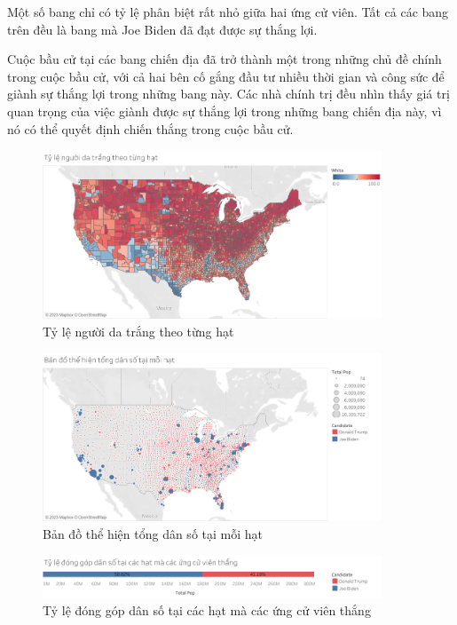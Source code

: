 \documentclass[14pt, a4paper]{article}
\numberwithin{equation}{section}
\numberwithin{figure}{section}
\numberwithin{dl}{section}
\numberwithin{md}{section}
\numberwithin{bd}{section}
\numberwithin{dn}{section}
\numberwithin{hq}{section}
\begin{document}
    Một số bang chỉ có tỷ lệ phân biệt rất nhỏ giữa hai ứng cử viên.
    Tất cả các bang trên đều là bang mà Joe Biden đã đạt được sự thắng lợi.

    Cuộc bầu cử tại các bang chiến địa đã trở thành một trong những chủ đề chính trong cuộc bầu cử, với cả hai bên cố gắng đầu tư nhiều thời gian và công sức để giành sự thắng lợi trong những bang này. 
    Các nhà chính trị đều nhìn thấy giá trị quan trọng của việc giành được sự thắng lợi trong những bang chiến địa này, vì nó có thể quyết định chiến thắng trong cuộc bầu cử.

    \begin{figure}[h!]
        \centering
        \includegraphics[width=0.9\textwidth]{figures/County_Percentage_White_People.png}
        \caption{Tỷ lệ người da trắng theo từng hạt}
    \end{figure}

    \begin{figure}[h!]
        \centering
        \includegraphics[width=0.9\textwidth]{figures/County_Total_Population_Circle.png}
        \caption{Bản đồ thể hiện tổng dân số tại mỗi hạt}
    \end{figure}

    \begin{figure}[h!]
        \centering
        \includegraphics[width=0.9\textwidth]{figures/County_Percentage_Population_Candidate.png}
        \caption{Tỷ lệ đóng góp dân số tại các hạt mà các ứng cử viên thắng}
    \end{figure}
\end{document}

